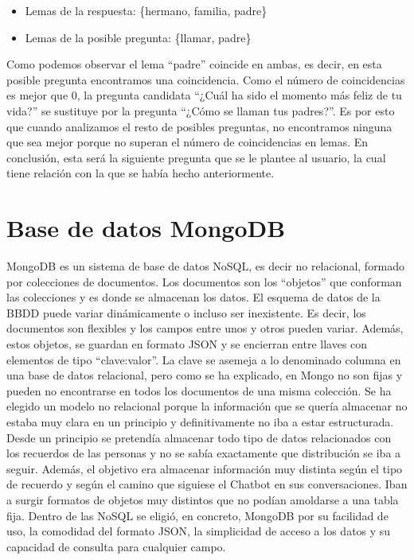 \begin{itemize}
	\item[] Lemas de la respuesta: \hspace{2cm} \{hermano, familia, padre\} 
	\item[] Lemas de la posible pregunta: \hspace{0.8cm} \{llamar, padre\}
\end{itemize}

Como podemos observar el lema ``padre'' coincide en ambas, es decir, en esta posible pregunta encontramos una coincidencia. Como el número de coincidencias es mejor que 0, la pregunta candidata ``¿Cuál ha sido el momento más feliz de tu vida?'' se sustituye por la pregunta ``¿Cómo se llaman tus padres?''. Es por esto que cuando analizamos el resto de posibles preguntas, no encontramos ninguna que sea mejor porque no superan el número de coincidencias en lemas. En conclusión, esta será la siguiente pregunta que se le plantee al usuario, la cual tiene relación con la que se había hecho anteriormente. 

\section{Base de datos MongoDB}

MongoDB es un sistema de base de datos NoSQL, es decir no relacional, formado por colecciones de documentos. Los documentos son los ``objetos'' que conforman las colecciones y es donde se almacenan los datos. El esquema de datos de la BBDD puede variar dinámicamente o incluso ser inexistente. Es decir, los documentos son flexibles y los campos entre unos y otros pueden variar. Además, estos objetos, se guardan en formato JSON y se encierran entre llaves con elementos de tipo ``clave:valor''. La clave se asemeja a lo denominado columna en una base de datos relacional, pero como se ha explicado, en Mongo no son fijas y pueden no encontrarse en todos los documentos de una misma colección. Se ha elegido un modelo no relacional porque la información que se quería almacenar no estaba muy clara en un principio y definitivamente no iba a estar estructurada. Desde un principio se pretendía almacenar todo tipo de datos relacionados con los recuerdos de las personas y no se sabía exactamente que distribución se iba a seguir. Además, el objetivo era almacenar información muy distinta según el tipo de recuerdo y según el camino que siguiese el Chatbot en sus conversaciones. Iban a surgir formatos de objetos muy distintos que no podían amoldarse a una tabla fija. Dentro de las NoSQL se eligió, en concreto, MongoDB por su facilidad de uso, la comodidad del formato JSON, la simplicidad de acceso a los datos y su capacidad de consulta para cualquier campo. 

